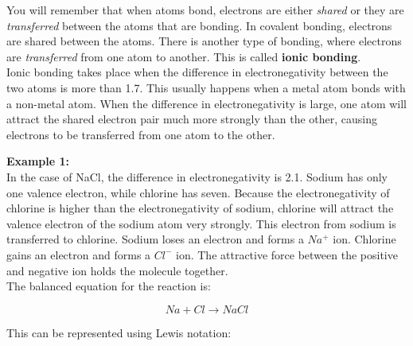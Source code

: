 You will remember that when atoms bond, electrons are either \textit{shared} or they are \textit{transferred} between the atoms that are bonding. In covalent bonding, electrons are shared between the atoms. There is another type of bonding, where electrons are \textit{transferred} from one atom to another. This is called \textbf{ionic bonding}.\\

Ionic bonding takes place when the difference in electronegativity between the two atoms is more than 1.7. This usually happens when a metal atom bonds with a non-metal atom. When the difference in electronegativity is large, one atom will attract the shared electron pair much more strongly than the other, causing electrons to be transferred from one atom to the other.


\textbf{Example 1:}\\

In the case of NaCl, the difference in electronegativity is 2.1. Sodium has only one valence electron, while chlorine has seven. Because the electronegativity of chlorine is higher than the electronegativity of sodium, chlorine will attract the valence electron of the sodium atom very strongly. This electron from sodium is transferred to chlorine. Sodium loses an electron and forms a $Na^{+}$ ion. Chlorine gains an electron and forms a $Cl^{-}$ ion. The attractive force between the positive and negative ion holds the molecule together.\\

The balanced equation for the reaction is:

\begin{equation*}
Na + Cl \rightarrow NaCl
\end{equation*}

This can be represented using Lewis notation:

